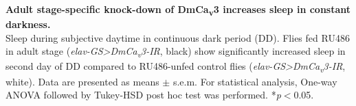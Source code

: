 \label{fig:S4}
\textbf{Adult stage-specific knock-down of DmCa\textsubscript{v}3 increases sleep in constant darkness.}
\\
Sleep during subjective daytime in continuous dark period (DD). 
Flies fed RU486 in adult stage (\emph{elav-GS\textgreater{}DmCa\textsubscript{v}3-IR}, black) show significantly increased sleep in second day of DD compared to RU486-unfed control flies (\emph{elav-GS\textgreater{}DmCa\textsubscript{v}3-IR}, white).
Data are presented as means $\pm$ s.e.m.
For statistical analysis, One-way ANOVA followed by Tukey-HSD post hoc test was performed.
*\emph{p}$<$0.05.